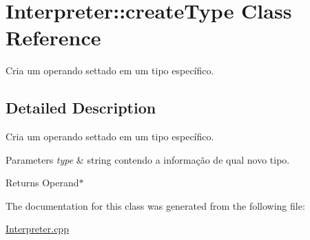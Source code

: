 \hypertarget{class_interpreter_1_1create_type}{}\section{Interpreter\+:\+:create\+Type Class Reference}
\label{class_interpreter_1_1create_type}


Cria um operando settado em um tipo específico.  




\subsection{Detailed Description}
Cria um operando settado em um tipo específico. 


\begin{DoxyParams}{Parameters}
{\em type} & string contendo a informação de qual novo tipo. \\
\hline
\end{DoxyParams}
\begin{DoxyReturn}{Returns}
Operand$\ast$ 
\end{DoxyReturn}


The documentation for this class was generated from the following file\+:\begin{DoxyCompactItemize}
\item 
\hyperlink{_interpreter_8cpp}{Interpreter.\+cpp}\end{DoxyCompactItemize}
